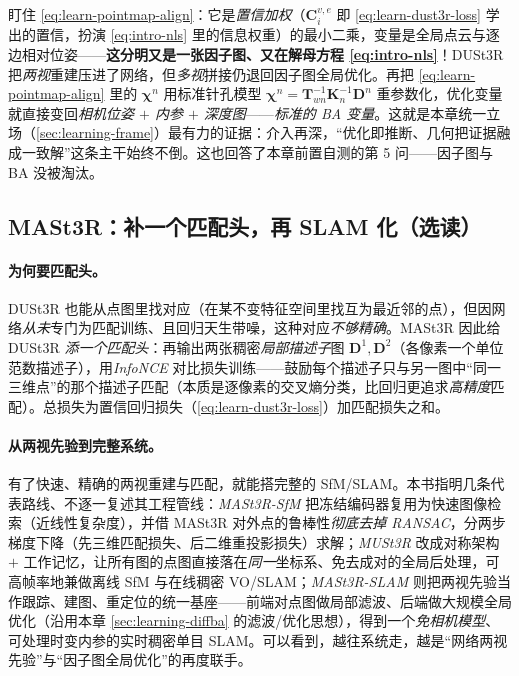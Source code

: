 \begin{insight}
盯住 \cref{eq:learn-pointmap-align}：它是\emph{置信加权}（$\mathbf{C}^{v,e}_i$ 即 \cref{eq:learn-dust3r-loss} 学出的置信，扮演 \cref{eq:intro-nls} 里的信息权重）的最小二乘，变量是全局点云与逐边相对位姿——\textbf{这分明又是一张因子图、又在解母方程 \cref{eq:intro-nls}}！DUSt3R 把\emph{两视}重建压进了网络，但\emph{多视}拼接仍退回因子图全局优化。再把 \cref{eq:learn-pointmap-align} 里的 $\boldsymbol\chi^n$ 用标准针孔模型 $\boldsymbol\chi^n=\mathbf{T}_{wn}^{-1}\mathbf{K}_n^{-1}\mathbf{D}^n$ 重参数化，优化变量就直接变回\emph{相机位姿 $+$ 内参 $+$ 深度图}——\emph{标准的 BA 变量}。这就是本章统一立场（\cref{sec:learning-frame}）最有力的证据：介入再深，“优化即推断、几何把证据融成一致解”这条主干始终不倒。这也回答了本章前置自测的第 5 问——因子图与 BA 没被淘汰。
\end{insight}

\subsection{MASt3R：补一个匹配头，再 SLAM 化（选读）}
\label{sec:learning-pointmap-mast3r}

\paragraph{为何要匹配头。}
DUSt3R 也能从点图里找对应（在某不变特征空间里找互为最近邻的点），但因网络\emph{从未}专门为匹配训练、且回归天生带噪，这种对应\emph{不够精确}\cite{leroy2024mast3r}。MASt3R 因此给 DUSt3R \emph{添一个匹配头}：再输出两张稠密\emph{局部描述子}图 $\mathbf{D}^1,\mathbf{D}^2$（各像素一个单位范数描述子），用\emph{InfoNCE} 对比损失训练——鼓励每个描述子只与另一图中“同一三维点”的那个描述子匹配（本质是逐像素的交叉熵分类，比回归更追求\emph{高精度}匹配）。总损失为置信回归损失（\cref{eq:learn-dust3r-loss}）加匹配损失之和。

\paragraph{从两视先验到完整系统。}
有了快速、精确的两视重建与匹配，就能搭完整的 SfM/SLAM。本书指明几条代表路线、不逐一复述其工程管线\cite{leroy2024mast3r}：\emph{MASt3R-SfM} 把冻结编码器复用为快速图像检索（近线性复杂度），并借 MASt3R 对外点的鲁棒性\emph{彻底去掉 RANSAC}，分两步梯度下降（先三维匹配损失、后二维重投影损失）求解；\emph{MUSt3R} 改成对称架构 $+$ 工作记忆，让所有图的点图直接落在\emph{同一}坐标系、免去成对的全局后处理，可高帧率地兼做离线 SfM 与在线稠密 VO/SLAM；\emph{MASt3R-SLAM} 则把两视先验当作跟踪、建图、重定位的统一基座——前端对点图做局部滤波、后端做大规模全局优化（沿用本章 \cref{sec:learning-diffba} 的滤波/优化思想），得到一个\emph{免相机模型}、可处理时变内参的实时稠密单目 SLAM。可以看到，越往系统走，越是“网络两视先验”与“因子图全局优化”的再度联手。

